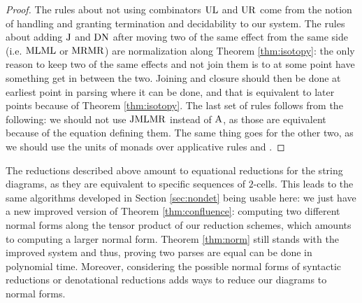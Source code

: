 \begin{proof}
	The rules about not using combinators $\text{UL}$ and $\text{UR}$ come from the
	notion of handling and granting termination and decidability to our system.
	The rules about adding $\text{J}$ and $\text{DN}$ after moving two of the same
	effect from the same side (i.e. $\text{ML} \text{ML}$ or $\text{MR}\text{MR}$) are
	normalization along Theorem \ref{thm:isotopy}: the only reason to keep two of
	the same effects and not join them is to at some point	have something get in
	between the two.
	Joining and closure should then be done at earliest point in parsing where it
	can be done, and that is equivalent to later points because of Theorem
	\ref{thm:isotopy}.
	The last set of rules follows from the following: we should not use $\text{J}
		\text{ML} \text{MR}$ instead of $\text{A}$, as those are equivalent because of the
	equation defining them.
	The same thing goes for the other two, as we should use the units of monads
	over applicative rules and \fmap.
\end{proof}

The reductions described above amount to equational reductions for the string
diagrams, as they are equivalent to specific sequences of $2$-cells.
This leads to the same algorithms developed in Section \ref{sec:nondet} being
usable here: we just have a new improved version of Theorem
\ref{thm:confluence}: computing two different normal forms along the
tensor product of our reduction schemes, which amounts to computing a larger
normal form.
Theorem \ref{thm:norm} still stands with the improved system and thus, proving
two parses are equal can be done in polynomial time.
Moreover, considering the possible normal forms of syntactic reductions
or denotational reductions adds ways to reduce our diagrams to normal forms.
